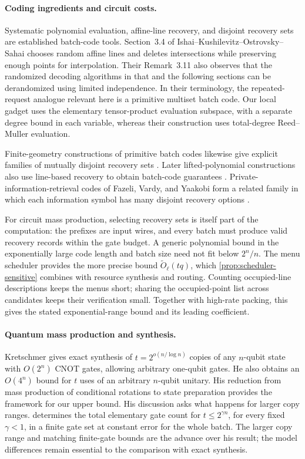 \documentclass[11pt]{article}
\begin{document}
\paragraph{Coding ingredients and circuit costs.}
Systematic polynomial evaluation, affine-line recovery, and disjoint recovery
sets are established batch-code tools.  Section~3.4 of
Ishai--Kushilevitz--Ostrovsky--Sahai \cite{IKOS2004} chooses random affine lines
and deletes
intersections while preserving enough points for interpolation.  Their
Remark~3.11 also observes that the randomized decoding algorithms in that and
the following sections can be derandomized using limited independence.
In their terminology, the repeated-request analogue relevant here is a
primitive multiset batch code.  Our local gadget uses the elementary
tensor-product evaluation subspace, with a separate degree bound in each
variable, whereas their construction uses total-degree Reed--Muller evaluation.

Finite-geometry constructions of primitive batch codes likewise give explicit
families of mutually disjoint recovery sets \cite{PolyanskiiVorobyev2019}.
Later lifted-polynomial constructions also use line-based recovery to obtain
batch-code guarantees \cite{HolzbaurEtAl2020}.  Private-information-retrieval
codes of Fazeli, Vardy, and Yaakobi form a related family in which each
information symbol has many disjoint recovery options
\cite{FazeliVardyYaakobi2015}.

For circuit mass production, selecting recovery sets is itself part of the
computation: the prefixes are input wires, and every batch must produce valid
recovery records within the gate budget.  A generic polynomial bound in the
exponentially large code length and batch size need not fit below $2^n/n$.
The menu scheduler provides the more precise bound
$\widetilde O_\ell(tq)$, which \cref{prop:scheduler-sensitive} combines with
resource synthesis and routing.  Counting occupied-line descriptions keeps the
menus short; sharing the occupied-point list across candidates keeps their
verification small.  Together with high-rate packing, this gives the stated
exponential-range bound and its leading coefficient.

\paragraph{Quantum mass production and synthesis.}
Kretschmer \cite[Sections~3--4]{Kretschmer2023} gives exact synthesis of
$t=2^{o(n/\log n)}$ copies of any $n$-qubit state with $O(2^n)$ CNOT
gates, allowing arbitrary one-qubit gates.  He also obtains an $O(4^n)$
bound for $t$ uses of an arbitrary $n$-qubit unitary.  His reduction from
mass production of conditional rotations to state preparation provides
the framework for our upper bound.  His discussion asks what happens for
larger copy ranges.   determines the total elementary
gate count for $t\le2^{\gamma n}$, for every fixed $\gamma<1$, in a finite
gate set at constant error for the whole batch.  The larger copy range
and matching finite-gate bounds are the advance over his result; the
model differences remain essential to the comparison with exact synthesis.
\end{document}
